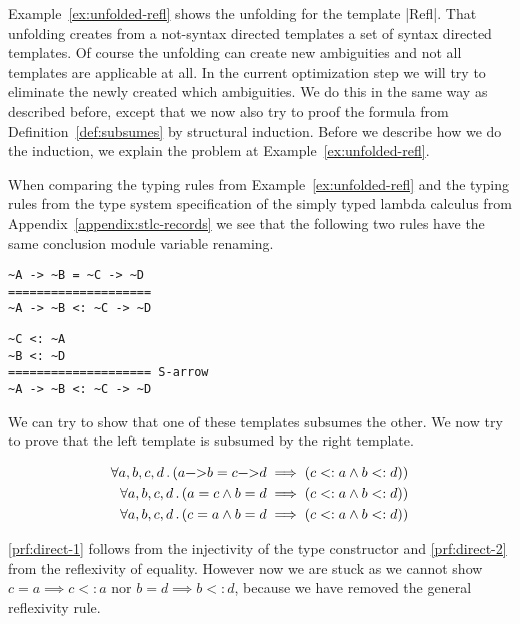 Example~\ref{ex:unfolded-refl} shows the unfolding for the template
\code|Refl|. That unfolding creates from a not-syntax directed
templates a set of syntax directed templates. Of course the unfolding
can create new ambiguities and not all templates are applicable at
all. In the current optimization step we will try to eliminate the
newly created which ambiguities. We do this in the same way as
described before, except that we now also try to proof the formula
from Definition~\ref{def:subsumes} by structural induction. Before we
describe how we do the induction, we explain the problem at
Example~\ref{ex:unfolded-refl}.

When comparing the typing rules from Example~\ref{ex:unfolded-refl}
and the typing rules from the type system specification of the simply
typed lambda calculus from Appendix~\ref{appendix:stlc-records} we see
that the following two rules have the same conclusion module variable
renaming.

\begin{minipage}[b]{.4\linewidth}
\begin{lstlisting}[language=sltc]
~A -> ~B = ~C -> ~D
====================
~A -> ~B <: ~C -> ~D
\end{lstlisting}
\end{minipage}
\begin{minipage}[b]{.5\linewidth}
\begin{lstlisting}[language=sltc]
~C <: ~A
~B <: ~D
==================== S-arrow 
~A -> ~B <: ~C -> ~D
\end{lstlisting}
\end{minipage}

We can try to show that one of these templates subsumes the other. We
now try to prove that the left template is subsumed by the right
template.

\begin{align}
  \forall a,b,c,d \,.\, (a \text{\code|->|} b = c \text{\code|->|} d \implies (c <:
  a \land b <: d)) \\
  \forall a,b,c,d \,.\, (a = c \land b = d \implies (c <: a \land b <:
  d)) \label{prf:direct-1}\\
 \forall a,b,c,d \,.\, (c = a \land b = d \implies (c <: a \land b <:
 d)) \label{prf:direct-2}
\end{align}

\ref{prf:direct-1} follows from the injectivity of the type
constructor and \ref{prf:direct-2} from the reflexivity of
equality. However now we are stuck as we cannot show $c = a \implies c
<: a$ nor $b = d \implies b <: d$, because we have removed the general
reflexivity rule.

